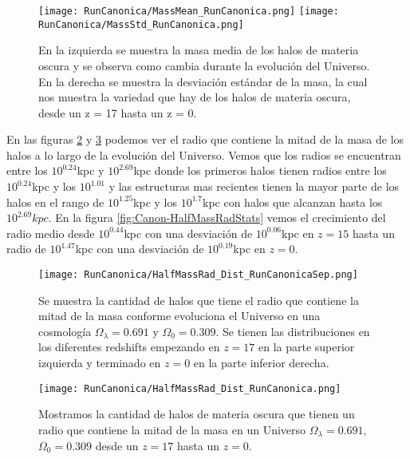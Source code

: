 \begin{figure}[H]
    \centering
    \texttt{[image: RunCanonica/MassMean\_RunCanonica.png]}
    \texttt{[image: RunCanonica/MassStd\_RunCanonica.png]}
    \caption[Media y desviación estándar de la distribución de masa]{\footnotesize En la izquierda se muestra la masa media de los halos de materia oscura y se observa como cambia durante la evolución del Universo. En la derecha se muestra la desviación estándar de la masa, la cual nos muestra la variedad que hay de los halos de materia oscura, desde un z = 17 hasta un z = 0.}
    \label{fig:Canon-MassStats}
\end{figure}

En las figuras \ref{fig:Canon-HalfMassRadDistSep} y \ref{fig:Canon-HalfMassRadDist} podemos ver el radio que contiene la mitad de la masa de los halos a lo largo de la evolución del Universo. Vemos que los radios se encuentran entre los $10^{0.24}$kpc y $10^{2.69}$kpc donde los primeros halos tienen radios entre los $10^{0.24}$kpc y los $10^{1.01}$ y las estructuras mas recientes tienen la mayor parte de los halos en el rango de $10^{1.25}$kpc y los $10^{1.7}$kpc con halos que alcanzan hasta los $10^{2.69}kpc$. En la figura \ref{fig:Canon-HalfMassRadStats} vemos el crecimiento del radio medio desde $10^{0.44}$kpc con una desviación de $10^{0.06}$kpc en $z=15$ hasta un radio de $10^{1.47}$kpc con una desviación de $10^{0.19}$kpc en $z=0$.

\begin{figure}[H]
    \centering
    \texttt{[image: RunCanonica/HalfMassRad\_Dist\_RunCanonicaSep.png]}
    \caption[Radio que contiene la mitad de la masa]{\footnotesize Se muestra la cantidad de halos que tiene el radio que contiene la mitad de la masa conforme evoluciona el Universo en una cosmología $\Omega_\lambda = 0.691 $ y $\Omega_0 = 0.309$. Se tienen las distribuciones en los diferentes redshifts empezando en $z=17$ en la parte superior izquierda y terminado en $z=0$ en la parte inferior derecha.}
    \label{fig:Canon-HalfMassRadDistSep}
\end{figure}

\begin{figure}[H]
    \centering
    \texttt{[image: RunCanonica/HalfMassRad\_Dist\_RunCanonica.png]}
    \caption[Distribución del radio que contiene la mitad de la masa]{\footnotesize Mostramos la cantidad de halos de materia oscura que tienen un radio que contiene la mitad de la masa en un Universo $\Omega_\lambda = 0.691 $, $\Omega_0 = 0.309$ desde un $z=17$ hasta un $z=0$.}
    \label{fig:Canon-HalfMassRadDist}
\end{figure}

